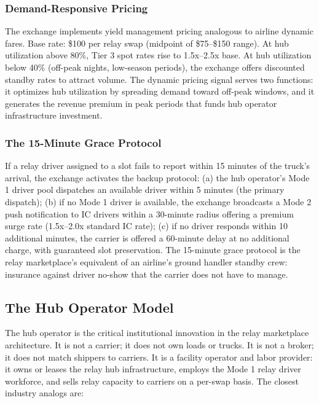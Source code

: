 \subsubsection*{Demand-Responsive Pricing}

The exchange implements yield management pricing analogous to airline dynamic fares. Base rate: \$100 per relay swap (midpoint of \$75--\$150 range). At hub utilization above 80\%, Tier 3 spot rates rise to 1.5x--2.5x base. At hub utilization below 40\% (off-peak nights, low-season periods), the exchange offers discounted standby rates to attract volume. The dynamic pricing signal serves two functions: it optimizes hub utilization by spreading demand toward off-peak windows, and it generates the revenue premium in peak periods that funds hub operator infrastructure investment.

\subsubsection*{The 15-Minute Grace Protocol}

If a relay driver assigned to a slot fails to report within 15 minutes of the truck's arrival, the exchange activates the backup protocol: (a) the hub operator's Mode 1 driver pool dispatches an available driver within 5 minutes (the primary dispatch); (b) if no Mode 1 driver is available, the exchange broadcasts a Mode 2 push notification to IC drivers within a 30-minute radius offering a premium surge rate (1.5x--2.0x standard IC rate); (c) if no driver responds within 10 additional minutes, the carrier is offered a 60-minute delay at no additional charge, with guaranteed slot preservation. The 15-minute grace protocol is the relay marketplace's equivalent of an airline's ground handler standby crew: insurance against driver no-show that the carrier does not have to manage.

\subsection{The Hub Operator Model}

The hub operator is the critical institutional innovation in the relay marketplace architecture. It is not a carrier; it does not own loads or trucks. It is not a broker; it does not match shippers to carriers. It is a facility operator and labor provider: it owns or leases the relay hub infrastructure, employs the Mode 1 relay driver workforce, and sells relay capacity to carriers on a per-swap basis. The closest industry analogs are:

